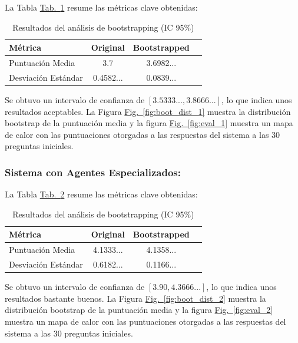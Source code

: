 \documentclass[10pt]{llncs}
\newcommand{\figref}[1]{\hyperref[#1]{Fig.~\ref*{#1}}}
\newcommand{\tabref}[1]{\hyperref[#1]{Tab.~\ref*{#1}}}
\begin{document}
La Tabla \tabref{tab:boot_results_1} resume las métricas clave obtenidas:

\begin{table}[h]
\centering
\caption{Resultados del análisis de bootstrapping (IC 95\%)}
\label{tab:boot_results_1}
\begin{tabular}{lccc}
\hline
\textbf{Métrica} & \textbf{Original} & \textbf{Bootstrapped}  \\
\hline 
Puntuación Media& 3.7 & 3.6982...  \\
Desviación Estándar & 0.4582... & 0.0839...  \\
\hline
\end{tabular}
\end{table}

\begin{remark}
Se obtuvo un intervalo de confianza de $[3.5333..., 3.8666...]$, lo que indica unos resultados aceptables. 
La Figura {\figref{fig:boot_dist_1}} muestra la distribución bootstrap de la puntuación media y la figura
{\figref{fig:eval_1}} muestra un mapa de calor con las puntuaciones otorgadas a las respuestas del sistema a las 
30 preguntas iniciales.
\end{remark}

\subsubsection{Sistema con Agentes Especializados:}

La Tabla \tabref{tab:boot_results_2} resume las métricas clave obtenidas:

\begin{table}[h]
\centering
\caption{Resultados del análisis de bootstrapping (IC 95\%)}
\label{tab:boot_results_2}
\begin{tabular}{lccc}
\hline
\textbf{Métrica} & \textbf{Original} & \textbf{Bootstrapped}  \\
\hline 
Puntuación Media& 4.1333... & 4.1358...  \\
Desviación Estándar & 0.6182... & 0.1166...  \\
\hline
\end{tabular}
\end{table}

\begin{remark}
Se obtuvo un intervalo de confianza de $[3.90,4.3666...]$, lo que indica unos resultados bastante buenos. 
La Figura {\figref{fig:boot_dist_2}} muestra la distribución bootstrap de la puntuación media y la figura 
{\figref{fig:eval_2}} muestra un mapa de calor con las puntuaciones otorgadas a las respuestas del sistema a las 
30 preguntas iniciales.
\end{remark}
\end{document}
